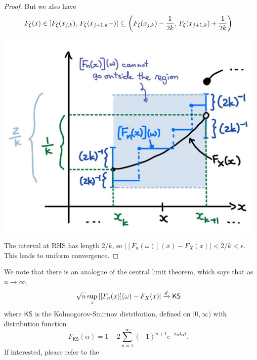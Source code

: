 \begin{unexaminable}
\begin{proof}
But we also have 
\begin{equation*}
F_\xi(x) \in \left[ F_\xi(x_{j,k}), \,  F_\xi(x_{j+1,k}-) \right) \subseteq \left( F_\xi(x_{j,k})-\frac{1}{2k}, \,  F_\xi(x_{j+1,k})+\frac{1}{2k} \right)
\end{equation*}

\begin{center}
\includegraphics[scale=0.3]{figures/Fig1.3.jpg}
\end{center}
\captionof*{figure}{The bound of $[F_n(\omega)](x)$ (labelled as $[F_n(x)](\omega)$) for $x \in [x_{j,k}, x_{j,k+1})$}
\vspace{12pt}
The interval at RHS has length $2/k$, so $|[F_n(\omega)](x) - F_X(x)| < 2/k < \epsilon$. This leads to uniform convergence.
\end{proof}

\begin{remark}
We note that there is an analogue of the central limit theorem, which says that as $n \to \infty$,
\begin{equation}
\sqrt{n} \sup_x \left| [F_n(x)](\omega) - F_X(x) \right| \xrightarrow{d} \mathsf{KS} 
\end{equation}
where $\mathsf{KS}$ is the Kolmogorov-Smirnov distribution, defined on $[0,\infty)$ with distribution function
\begin{equation}
F_{\mathsf{KS}}(\alpha) = 1-2 \sum_{n=1}^\infty (-1)^{n+1} e^{-2n^2\alpha^2}.
\end{equation}
If interested, please refer to the 
\end{remark}
\end{unexaminable}

